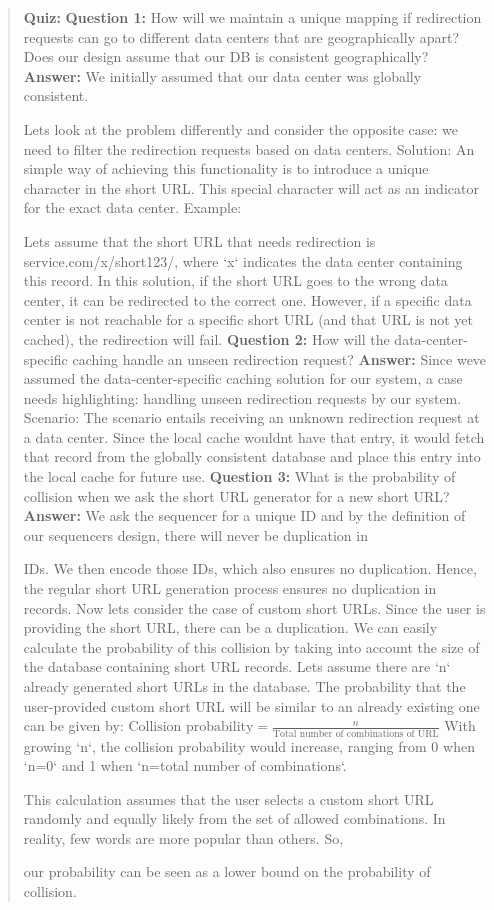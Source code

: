 \begin{quote}
\textbf{Quiz:}
\textbf{Question 1:} How will we maintain a unique mapping if redirection requests can go to different data centers that are geographically apart? Does our design assume that our DB is consistent geographically?
\textbf{Answer:} We initially assumed that our data center was globally consistent.

Let\textquotesingle s look at the problem differently and consider the opposite case: we need to filter the redirection requests based on data centers. Solution: An simple way of achieving this functionality is to introduce a unique character in the short URL. This special character will act as an indicator for the exact data center. Example:

Let\textquotesingle s assume that the short URL that needs redirection is service.com/x/short123/, where `x` indicates the data center containing this record. In this solution, if the short URL goes to the wrong data center, it can be redirected to the correct one. However, if a specific data center is not reachable for a specific short URL (and that URL is not yet cached), the redirection will fail.
\textbf{Question 2:} How will the data-center-specific caching handle an unseen redirection request?
\textbf{Answer:} Since we\textquotesingle ve assumed the data-center-specific caching solution for our system, a case needs highlighting: handling unseen redirection requests by our system. Scenario: The scenario entails receiving an unknown redirection request at a data center. Since the local cache wouldn\textquotesingle t have that entry, it would fetch that record from the globally consistent database and place this entry into the local cache for future use.
\textbf{Question 3:} What is the probability of collision when we ask the short URL generator for a new short URL?
\textbf{Answer:} We ask the sequencer for a unique ID and by the definition of our sequencer\textquotesingle s design, there will never be duplication in

IDs. We then encode those IDs, which also ensures no duplication. Hence, the regular short URL generation process ensures no duplication in records. Now let\textquotesingle s consider the case of custom short
URLs. Since the user is providing the short URL, there can be a duplication. We can easily calculate the probability of this collision by taking into account the size of the database containing short URL records. Let\textquotesingle s assume there are `n` already generated short URLs in the database. The probability that the user-provided custom short URL will be similar to an already existing one can be given by: $ 
\text{Collision probability}
= \frac{n}{\text{Total number of combinations of URL}}
$
 With growing `n`, the collision probability would increase, ranging from 0 when `n=0` and 1 when `n=total number of combinations`.
 
This calculation assumes that the user selects a custom short URL randomly and equally likely from the set of allowed combinations. In reality, few words are more popular than others. So,

our probability can be seen as a lower bound on the probability of collision.
\end{quote}

